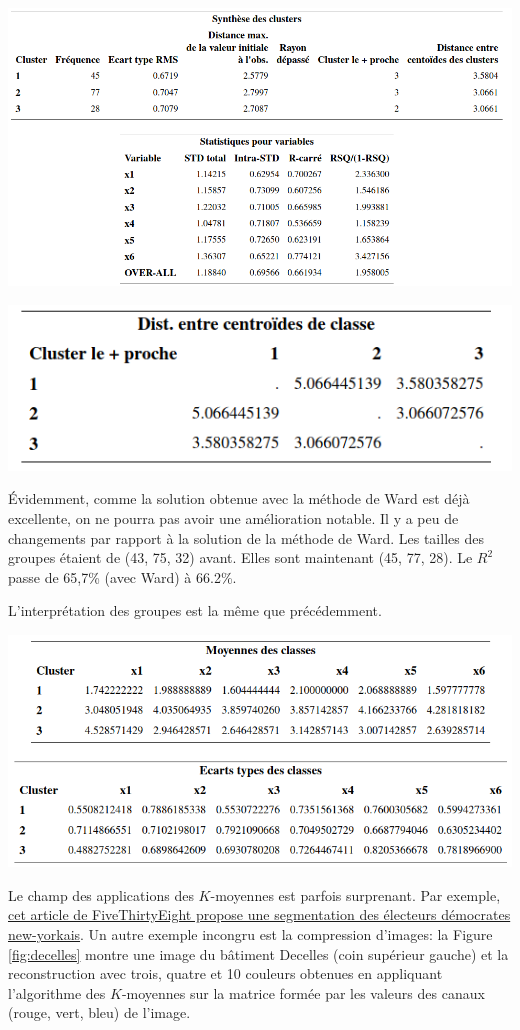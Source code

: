 \documentclass[
  11pt,
  letterpaper,
]{book}
\theoremstyle{definition}
\theoremstyle{definition}
\theoremstyle{definition}
\theoremstyle{definition}
\theoremstyle{remark}
\begin{document}
\begin{center}\includegraphics[width=0.9\linewidth]{figures/04-clustering-e15} \end{center}

\begin{center}\includegraphics[width=0.5\linewidth]{figures/04-clustering-e16} \end{center}

Évidemment, comme la solution obtenue avec la méthode de Ward est déjà excellente, on ne pourra pas avoir une amélioration notable. Il y a peu de changements par rapport à la solution de la méthode de Ward. Les tailles des groupes étaient de (43, 75, 32) avant. Elles sont maintenant (45, 77, 28). Le \(R^2\) passe de 65,7\% (avec Ward) à 66.2\%.

L'interprétation des groupes est la même que précédemment.

\begin{center}\includegraphics[width=0.7\linewidth]{figures/04-clustering-e17} \end{center}

Le champ des applications des \(K\)-moyennes est parfois surprenant. Par exemple, \href{https://fivethirtyeight.com/features/the-5-political-boroughs-of-new-york-city/}{cet article de FiveThirtyEight propose une segmentation des électeurs démocrates new-yorkais}. Un autre exemple incongru est la compression d'images: la Figure \ref{fig:decelles} montre une image du bâtiment Decelles (coin supérieur gauche) et la reconstruction avec trois, quatre et 10 couleurs obtenues en appliquant l'algorithme des \(K\)-moyennes sur la matrice formée par les valeurs des canaux (rouge, vert, bleu) de l'image.
\end{document}
